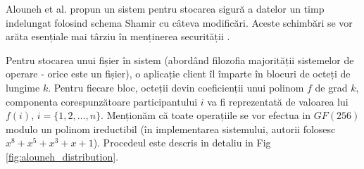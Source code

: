 \documentclass[oneside, 12pt]{book}
\begin{document}
Alouneh et al. propun un sistem pentru stocarea sigură a datelor un timp indelungat folosind schema Shamir cu câteva modificări. Aceste schimbări se vor arăta esențiale mai târziu în menținerea securității \cite{AAMK:2013}.

Pentru stocarea unui fișier în sistem (abordând filozofia majorității sistemelor de operare - orice este un fișier), o aplicație client îl împarte în blocuri de octeți de lungime $k$. Pentru fiecare bloc, octeții devin coeficienții unui polinom $f$ de grad $k$, componenta corespunzătoare participantului $i$ va fi reprezentată de valoarea lui $f(i)$, $i = \{1,2,\dots, n\}$. 
Menționăm că toate operațiile se vor efectua in $GF(256)$ modulo un polinom ireductibil (în implementarea sistemului, autorii folosesc $x^8 + x^5 + x^3 + x + 1$). Procedeul este descris in detaliu in Fig \ref{fig:alouneh_distribution}.
\end{document}
